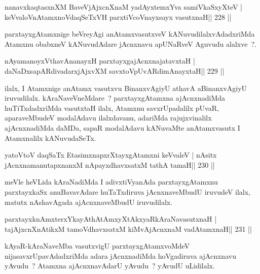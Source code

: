 
\begin{shl}
nanavxkaqtasxnXM BaveVjAjxcnXnaM yadAyxtemxYva samiVkaSxyXteV |
keVvaloV\s nAtamxnoV\s daqSeTxVH parxtiVcoV\s nayxsayx vasutxnaH\hfill || 228 ||
\end{shl}

\begin{artha}
parxtayxgAtamxnige beVreyAgi anAtamxvasutxveV kANuvudilalxvAdadxriMda Atamxnu obabxneV kANuvudAdare jAcnxnavu apUNaRveV Aguvudu alalxve~?.
\end{artha}


\begin{shl}
nAyamanoyxV\s thavA\s nanayxH parxtayxgajAcnxnajatavxtaH |
daNaDxsapARdivadarxjAjxvXM savxtoV\s pUvARdimAnayxtaH\hfill || 229 ||
\end{shl}

\begin{artha}
ilalx, I Atamxnige anAtamx vasutxvu BinanxvAgiyU athavA aBinanxvAgiyU iruvudilalx. kAraNaveVneMdare~? parxtayxgAtamxna ajAcnxnadiMda huTiTxdadxriMda vasutxtaH ilalx, Atamxnu savxrUpadalilx pUvaR, aparaveMbudeV modalAdavu ilalxdavanu, adariMda rajujxvinalilx ajAcnxnadiMda daMDa, sapaR modalAdavu kANuvaMte anAtamxvasutx I Atamxnalilx kANuvudaSeTx.
\end{artha}

\begin{shl}
yatoV\s toV daqSaTx EtasimxnapxrXtayxgAtamxni keVvaleV |
nAsitx jAcnxnamanutapxnanxM nApayxdhavxsatxM tathA tamaH\hfill || 230 ||
\end{shl}

\begin{artha}
meVle heVLida kAraNadiMda I adivxtiVyanAda parxtayxgAtamxnu parxtayxkaSx anuBavavAdare huTaTxdiruva jAcnxnaveMbudU iruvudeV ilalx, matutx nAshavAgada ajAcnxnaveMbudU iruvudilalx.
\end{artha}

\begin{shl}
parxtayxknAmxterxYkayAthAtAmxyXtAkxyaRkAraNavasutxnaH |
tajAjxcnXnAtikxM tamoV\s dhavxsatxM kiMvA\s jAcnxnaM vadA\s\s tamxnaH\hfill || 231 ||
\end{shl}

\begin{artha}
kAyaR-kAraNaveMba vasutxvigU parxtayxgAtamxvoMdeV nijasavxrUpavAdadxriMda adara jAcnxnadiMda hoVgadiruva ajAcnxnavu yAvudu~? Atamxna ajAcnxnavAdarU yAvudu~? yAvudU uLidilalx.
\end{artha}

